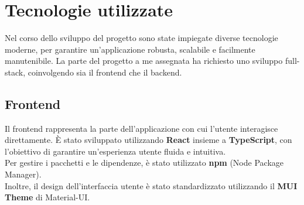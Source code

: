 \chapter{Tecnologie utilizzate}
Nel corso dello sviluppo del progetto sono state impiegate diverse tecnologie 
moderne, per garantire un'applicazione robusta, scalabile e facilmente manutenibile. 
La parte del progetto a me assegnata ha richiesto uno sviluppo full-stack, 
coinvolgendo sia il frontend che il backend.

\section{Frontend} 
Il frontend rappresenta la parte dell'applicazione con cui l'utente interagisce direttamente. 
È stato sviluppato utilizzando \textbf{React} insieme a \textbf{TypeScript}, 
con l'obiettivo di garantire un'esperienza utente fluida e intuitiva.
\\
Per gestire i pacchetti e le dipendenze, è stato utilizzato \textbf{npm} (Node Package Manager).
\\
Inoltre, il design dell'interfaccia utente è stato standardizzato 
utilizzando il \textbf{MUI Theme} di Material-UI.

